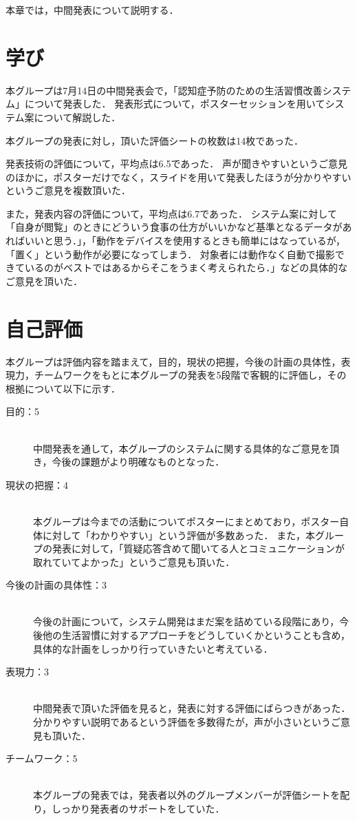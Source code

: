 \documentclass[../report]{subfiles}
\begin{document}
本章では，中間発表について説明する．

\section{学び}
本グループは7月14日の中間発表会で，「認知症予防のための生活習慣改善システム」について発表した．
発表形式について，ポスターセッションを用いてシステム案について解説した．

本グループの発表に対し，頂いた評価シートの枚数は14枚であった．

発表技術の評価について，平均点は6.5であった．
声が聞きやすいというご意見のほかに，ポスターだけでなく，スライドを用いて発表したほうが分かりやすいというご意見を複数頂いた．

また，発表内容の評価について，平均点は6.7であった．
システム案に対して「自身が閲覧」のときにどういう食事の仕方がいいかなど基準となるデータがあればいいと思う．」，「動作をデバイスを使用するときも簡単にはなっているが，「置く」という動作が必要になってしまう．
対象者には動作なく自動で撮影できているのがベストではあるからそこをうまく考えられたら．」などの具体的なご意見を頂いた．


\section{自己評価}
本グループは評価内容を踏まえて，目的，現状の把握，今後の計画の具体性，表現力，チームワークをもとに本グループの発表を5段階で客観的に評価し，その根拠について以下に示す．

\begin{description}
    \item[目的：5] \mbox{} \\
        中間発表を通して，本グループのシステムに関する具体的なご意見を頂き，今後の課題がより明確なものとなった．
    \item[現状の把握：4] \mbox{} \\
        本グループは今までの活動についてポスターにまとめており，ポスター自体に対して「わかりやすい」という評価が多数あった．
        また，本グループの発表に対して，「質疑応答含めて聞いてる人とコミュニケーションが取れていてよかった」というご意見も頂いた．
    \item[今後の計画の具体性：3] \mbox{} \\
        今後の計画について，システム開発はまだ案を詰めている段階にあり，今後他の生活習慣に対するアプローチをどうしていくかということも含め，具体的な計画をしっかり行っていきたいと考えている．
    \item[表現力：3] \mbox{} \\
        中間発表で頂いた評価を見ると，発表に対する評価にばらつきがあった．
        分かりやすい説明であるという評価を多数得たが，声が小さいというご意見も頂いた．
    \item[チームワーク：5] \mbox{} \\
        本グループの発表では，発表者以外のグループメンバーが評価シートを配り，しっかり発表者のサポートをしていた．
\end{description}
\end{document}
